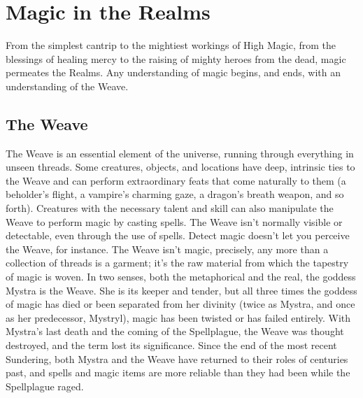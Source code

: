 \documentclass[10pt,a4paper,twoside,twocolumn,openany,bg=print,nodeprecatedcode]{dndbook}
\begin{document}
\section{Magic in the Realms}
From the simplest cantrip to the mightiest workings of High Magic, from the blessings of healing mercy to the raising of mighty heroes from the dead, magic permeates the Realms. Any understanding of magic begins, and ends, with an understanding of the Weave.
\subsection{The Weave}
The Weave is an essential element of the universe, running through everything in unseen threads. Some creatures, objects, and locations have deep, intrinsic ties to the Weave and can perform extraordinary feats that come naturally to them (a beholder's flight, a vampire's charming gaze, a dragon's breath weapon, and so forth). Creatures with the necessary talent and skill can also manipulate the Weave to perform magic by casting spells.
The Weave isn't normally visible or detectable, even through the use of spells. Detect magic doesn't let you perceive the Weave, for instance. The Weave isn't magic, precisely, any more than a collection of threads is a garment; it's the raw material from which the tapestry of magic is woven.
In two senses, both the metaphorical and the real, the goddess Mystra is the Weave. She is its keeper and tender, but all three times the goddess of magic has died or been separated from her divinity (twice as Mystra, and once as her predecessor, Mystryl), magic has been twisted or has failed entirely. With Mystra's last death and the coming of the Spellplague, the Weave was thought destroyed, and the term lost its significance. Since the end of the most recent Sundering, both Mystra and the Weave have returned to their roles of centuries past, and spells and magic items are more reliable than they had been while the Spellplague raged.
\end{document}
